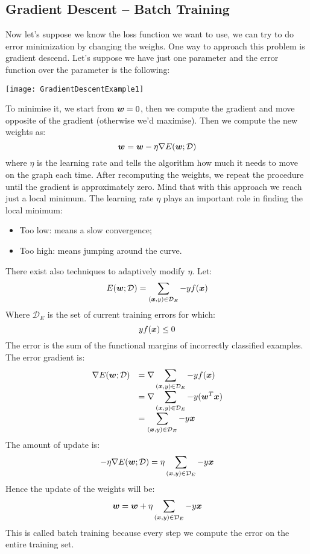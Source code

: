 \subsection{Gradient Descent -- Batch Training} %
Now let's suppose we know the loss function we want to use, we can try to do error minimization by changing the weighs. One way to approach this problem is gradient descend. Let's suppose we have just one parameter and the error function over the parameter is the following:
\begin{center}
  \texttt{[image: GradientDescentExample1]}
\end{center}
To minimise it, we start from $\bm{w}=0$, then we compute the gradient and move opposite of the gradient (otherwise we'd maximise). Then we compute the new weights as:
\[\bm{w}=\bm{w}-\eta\nabla E(\bm{w};\mathcal{D})\]
where $\eta$ is the learning rate and tells the algorithm how much it needs to move on the graph each time. \newline
After recomputing the weights, we repeat the procedure until the gradient is approximately zero. Mind that with this approach we reach just a local minimum. The learning rate $\eta$ plays an important role in finding the local minimum: 
\begin{itemize}
  \item Too low: means a slow convergence;
  \item Too high: means jumping around the curve.
\end{itemize}
There exist also techniques to adaptively modify $\eta$.
Let:
\[E(\bm{w};\mathcal{D})=\displaystyle\sum_{(\bm{x},y)\in\mathcal{D}_E}-yf(\bm{x})\]
Where $\mathcal{D}_E$ is the set of current training errors for which:
\[yf(\bm{x})\leq 0\]
The error is the sum of the functional margins of incorrectly classified examples. \newline
The error gradient is:
\begin{equation*}
  \begin{array}{ll}
    \nabla E(\bm{w};\mathcal{D})&=\nabla\displaystyle\sum_{(\bm{x},y)\in\mathcal{D}_E}-yf(\bm{x})\\
                                  &=\nabla\displaystyle\sum_{(\bm{x},y)\in\mathcal{D}_E}-y(\bm{w}^T\bm{x})\\
                                  &=\displaystyle\sum_{(\bm{x},y)\in\mathcal{D}_E}-y\bm{x}
  \end{array}
\end{equation*}
The amount of update is:
\[-\eta\nabla E(\bm{w};\mathcal{D})=\eta\displaystyle\sum_{(\bm{x},y)\in\mathcal{D}_E}-y\bm{x}\]
Hence the update of the weights will be:
\[\bm{w}=\bm{w}+\eta \displaystyle\sum_{(\bm{x},y)\in\mathcal{D}_E}-y\bm{x}\]
This is called batch training because every step we compute the error on the entire training set.
%
%
